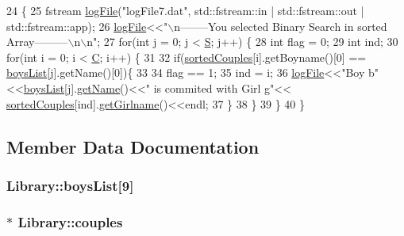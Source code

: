 \begin{DoxyCode}
24 \{
25     fstream \hyperlink{classLibrary_ad8fbb4e17a98e57b3cffe8257710045d}{logFile}(\textcolor{stringliteral}{"logFile7.dat"}, std::fstream::in | std::fstream::out | std::fstream::app);
26     \hyperlink{classLibrary_ad8fbb4e17a98e57b3cffe8257710045d}{logFile}<<\textcolor{stringliteral}{"\(\backslash\)n--------You selected Binary Search in sorted Array---------\(\backslash\)n\(\backslash\)n"};
27     \textcolor{keywordflow}{for}(\textcolor{keywordtype}{int} j = 0; j < \hyperlink{lib7_8h_a20a0f494ca2c397f664e1911db5e084b}{S}; j++) \{
28         \textcolor{keywordtype}{int} flag = 0;
29         \textcolor{keywordtype}{int} ind;
30         \textcolor{keywordflow}{for}(\textcolor{keywordtype}{int} i = 0; i < \hyperlink{lib7_8h_a5464533d23b59ba11030432e73528730}{C}; i++) \{
31 
32             \textcolor{keywordflow}{if}(\hyperlink{classLibrary_a30e860e047d63ab63b40ac42e9660f25}{sortedCouples}[i].getBoyname()[0] == \hyperlink{classLibrary_a0da9d216b9e07af39f5f0f3241a0a45c}{boysList}[j].getName()[0])\{
33 
34                 flag == 1;
35                 ind = i;        
36                 \hyperlink{classLibrary_ad8fbb4e17a98e57b3cffe8257710045d}{logFile}<<\textcolor{stringliteral}{"Boy b"}<<\hyperlink{classLibrary_a0da9d216b9e07af39f5f0f3241a0a45c}{boysList}[j].\hyperlink{classBoy_acf59fd0074a6ea3413751a95b2970303}{getName}()<<\textcolor{stringliteral}{" is commited with Girl g"}<<
      \hyperlink{classLibrary_a30e860e047d63ab63b40ac42e9660f25}{sortedCouples}[ind].\hyperlink{classcouple_a7897320b780dbeaa85380c71803de9c2}{getGirlname}()<<endl; 
37             \} 
38         \}
39     \}
40 \}
\end{DoxyCode}


\subsection{Member Data Documentation}
\subsubsection[{\texorpdfstring{boys\+List}{boysList}}]{ Library\+::boys\+List\mbox{[}9\mbox{]}}\hypertarget{classLibrary_a0da9d216b9e07af39f5f0f3241a0a45c}{}\label{classLibrary_a0da9d216b9e07af39f5f0f3241a0a45c}
\subsubsection[{\texorpdfstring{couples}{couples}}]{$\ast$ Library\+::couples}\hypertarget{classLibrary_a6c32f4296982c3281d61d12b1add0ede}{}\label{classLibrary_a6c32f4296982c3281d61d12b1add0ede}
